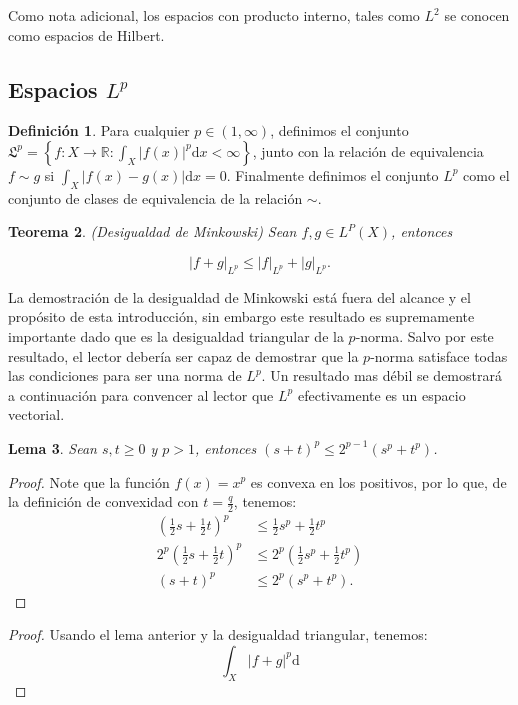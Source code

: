 \documentclass{article}
\newtheorem{thm}{Teorema}[section]
\newtheorem{lem}[thm]{Lema}
\theoremstyle{definition}
\newtheorem{defi}[thm]{Definición}
\begin{document}
Como nota adicional, los espacios con producto interno, tales como
$L^2$ se conocen como espacios de Hilbert.

\subsection{Espacios $L^p$}%
\label{sub:EspaciosL^p}

\begin{defi}
Para cualquier $p\in (1,\infty)$, definimos el conjunto $\mathfrak{L}^p=\left\{ f \colon X \to
\mathbb{R} : \int_{X}^{} {|f(x)|}^p \text{d}x<\infty \right\}$, junto
con la relación de equivalencia $f\sim g$ si $\int_{X}^{}
{|f(x)-g(x)|} \text{d}x=0$. Finalmente definimos el conjunto $L^p$
como el conjunto de clases de equivalencia de la relación $\sim$.
\end{defi}

\begin{thm}{(Desigualdad de Minkowski)}
Sean $f,g\in L^P(X)$, entonces

\[
|f+g|_{L^p}\le |f|_{L^p}+|g|_{L^p}.
\]
\end{thm}

La demostración de la desigualdad de Minkowski está fuera del alcance
y el propósito de esta introducción, sin embargo este resultado es
supremamente importante dado que es la desigualdad triangular de la
$p$-norma. Salvo por este resultado, el lector debería ser capaz de
demostrar que la $p$-norma satisface todas las condiciones para ser
una norma de $L^p$. Un resultado mas débil se demostrará a
continuación para convencer al lector que $L^p$ efectivamente es un
espacio vectorial.

\begin{lem}
Sean $s,t\ge 0$ y $p>1$, entonces $(s+t)^p\le 2^{p-1}(s^p+t^p)$.
\end{lem}
\begin{proof}
	Note que la función $f(x)=x^p$ es convexa en los positivos, por lo
que, de la definición de convexidad con $t=\frac{q}{2}$, tenemos:
\begin{equation*}
\begin{split}
{\left( \frac{1}{2}s+ \frac{1}{2}t \right)}^p &\le
\frac{1}{2}s^p+\frac{1}{2}t^p\\
2^p{\left( \frac{1}{2}s+ \frac{1}{2}t \right)}^p &\le
2^p{\left(\frac{1}{2}s^p+\frac{1}{2}t^p \right)}\\
(s+t)^p &\le  2^p(s^p+t^p).
\end{split}
\end{equation*}
\end{proof}


\begin{proof}
	Usando el lema anterior y la desigualdad triangular, tenemos:
\[
\int_{X}^{} |f+g|^p \text{d}
\]
\end{proof}
\end{document}
